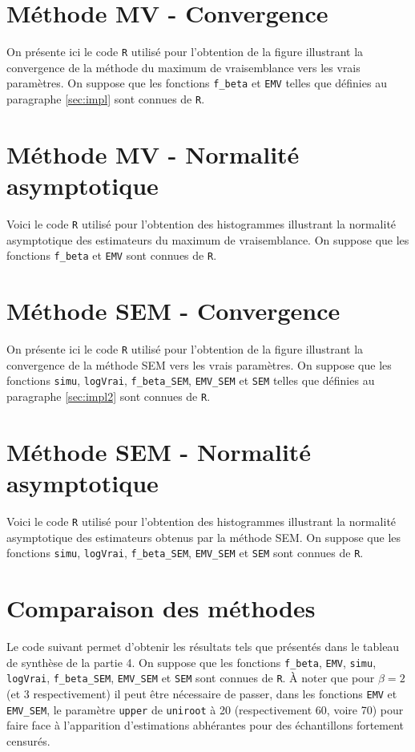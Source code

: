 \documentclass[a4paper]{report}
\begin{document}
  
 \begin{appendix}
 \chapter{Méthode MV - Convergence}
 \label{MV_cv}
 On présente ici le code \verb|R| utilisé pour l'obtention de la figure illustrant la convergence de la méthode du maximum de vraisemblance vers les vrais paramètres. On suppose que les fonctions \verb|f_beta| et \verb|EMV| telles que définies au paragraphe \ref{sec:impl} sont connues de \verb|R|.
  
  
   \chapter{Méthode MV - Normalité asymptotique}
 \label{MV_norm}
 Voici le code \verb|R| utilisé pour l'obtention des histogrammes illustrant la normalité asymptotique des estimateurs du maximum de vraisemblance. On suppose que les fonctions \verb|f_beta| et \verb|EMV| sont connues de \verb|R|.
  
  
   \chapter{Méthode SEM - Convergence}
 \label{SEM_cv}
 On présente ici le code \verb|R| utilisé pour l'obtention de la figure illustrant la convergence de la méthode SEM vers les vrais paramètres. On suppose que les fonctions \verb|simu|, \verb|logVrai|, \verb|f_beta_SEM|, \verb|EMV_SEM| et \verb|SEM| telles que définies au paragraphe \ref{sec:impl2} sont connues de \verb|R|.
  
  
   \chapter{Méthode SEM - Normalité asymptotique}
 \label{SEM_norm}
 Voici le code \verb|R| utilisé pour l'obtention des histogrammes illustrant la normalité asymptotique des estimateurs obtenus par la méthode SEM. On suppose que les fonctions \verb|simu|, \verb|logVrai|, \verb|f_beta_SEM|, \verb|EMV_SEM| et \verb|SEM| sont connues de \verb|R|.
  
  
  \chapter{Comparaison des méthodes}
  \label{comp}
  Le code suivant permet d'obtenir les résultats tels que présentés dans le tableau de synthèse de la partie 4. On suppose que les fonctions \verb|f_beta|, \verb|EMV|, \verb|simu|, \verb|logVrai|, \verb|f_beta_SEM|, \verb|EMV_SEM| et \verb|SEM| sont connues de \verb|R|. À noter que pour $\beta=2$ (et 3 respectivement) il peut être nécessaire de passer, dans les fonctions \verb|EMV| et \verb|EMV_SEM|, le paramètre \verb|upper| de \verb|uniroot| à 20 (respectivement 60, voire 70) pour faire face à l'apparition d'estimations abhérantes pour des échantillons fortement censurés. 
  

\end{appendix}
\end{document}
